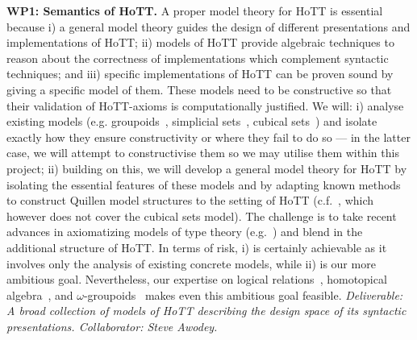 \documentclass[a4paper,11pt]{article}
\begin{document}
{\bf WP1: Semantics of HoTT.}  A proper model theory for
HoTT is essential because i) a general model theory guides the design
of different presentations and implementations of HoTT; ii) models of
HoTT provide algebraic techniques to reason about the correctness of
implementations which complement syntactic techniques; and iii)
specific implementations of HoTT can be proven sound by giving a
specific model of them.  These models need to be constructive so that
their validation of HoTT-axioms is computationally justified.
We will: i) analyse existing
models ({e.g.}  groupoids~\cite{HofmannM:groitt}, simplicial
sets~\cite{KapulkinC:simmuv}, cubical sets~\cite{BezemM:cubsmt}) and
isolate exactly how they ensure constructivity or where they fail to
do so --- in the latter case, we will attempt to constructivise them
so we may utilise them within this project;
ii) building on this, we will develop a general model theory for HoTT
by isolating the essential features of these models and by adapting
known methods to construct Quillen model structures to the setting of
HoTT ({c.f.}~\cite{ShulmanM:uniidh}, which however does not cover the
cubical sets model).  The challenge is to take recent advances in
axiomatizing models of type theory ({e.g.}~\cite{AwodeyS:natmtt}) and
blend in the additional structure of HoTT. In terms of risk, i) is
certainly achievable as it involves only the analysis of existing
concrete models, while ii) is our more ambitious goal. Nevertheless, our
expertise on logical relations~\cite{neil2014relParamDep},
homotopical algebra~\cite{GambinoN:homl2c,GambinoN:weilsh}, and
$\omega$-groupoids~\cite{alti:csl12,alti:tlca13-hedberg} makes even this ambitious goal
feasible. {\em Deliverable: A broad collection of models of HoTT
  describing the design space of its syntactic presentations.
  Collaborator: Steve Awodey.  }
\end{document}
